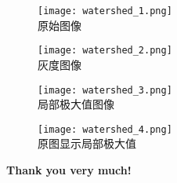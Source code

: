 \documentclass[notheorems,mathserif,table,compress]{beamer}  %
\begin{document}
\begin{frame}
   \begin{figure}
  \begin{minipage}[t]{0.4\textwidth} 
    \centering 
    \texttt{[image: watershed\_1.png]} \\
    原始图像
  \end{minipage}
  \begin{minipage}[t]{0.4\textwidth} 
    \centering 
    \texttt{[image: watershed\_2.png]} \\
    灰度图像
  \end{minipage}
  \begin{minipage}[b]{0.4\textwidth} 
    \centering 
    \texttt{[image: watershed\_3.png]} \\
    局部极大值图像
  \end{minipage}
  \begin{minipage}[b]{0.4\textwidth} 
    \centering 
    \texttt{[image: watershed\_4.png]} \\
    原图显示局部极大值
  \end{minipage}
\end{figure}
\end{frame}

\begin{frame}
   \begin{Huge}
   \textbf{Thank you very much!}
   \end{Huge}
\end{frame}
\end{document}
